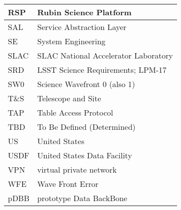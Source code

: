 \begin{longtable}{p{}p{}}
RSP & Rubin Science Platform \\\hline
SAL & Service Abstraction Layer \\\hline
SE & System Engineering \\\hline
SLAC & SLAC National Accelerator Laboratory \\\hline
SRD & LSST Science Requirements; LPM-17 \\\hline
SW0 & Science Wavefront 0 (also 1) \\\hline
T\&S & Telescope and Site \\\hline
TAP & Table Access Protocol \\\hline
TBD & To Be Defined (Determined) \\\hline
US & United States \\\hline
USDF & United States Data Facility \\\hline
VPN & virtual private network \\\hline
WFE & Wave Front Error \\\hline
pDBB & prototype Data BackBone \\\hline
\end{longtable}
